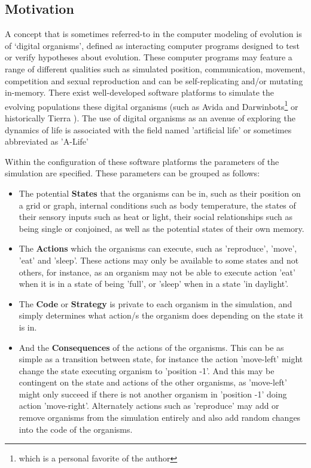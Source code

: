 \subsection{Motivation}
A concept that is sometimes referred-to in the computer modeling of evolution is of `digital organisms', defined as interacting computer programs designed to test or verify hypotheses about evolution.\cite{Lenski1999, Lenski2003, 10.1371/journal.pbio.0000018} These computer programs may feature a range of different qualities such as simulated position, communication, movement, competition and sexual reproduction and can be self-replicating and/or mutating in-memory. There exist well-developed software platforms to simulate the evolving populations these digital organisms (such as Avida and Darwinbots\footnote{which is a personal favorite of the author} or historically Tierra \cite{ray-approach-to-synthesis-1991}). The use of digital organisms as an avenue of exploring the dynamics of life is associated with the field named 'artificial life' or sometimes abbreviated as 'A-Life' \cite{journals/alife/BedauMPRAGIKR00}\cite{alife1}

Within the configuration of these software platforms the parameters of the simulation are specified. These parameters can be grouped as follows:

\begin{itemize}[leftmargin=*,labelsep=4mm]
\item   The potential \textbf{States} that the organisms can be in, such as their position on a grid or graph, internal conditions such as body temperature, the states of their sensory inputs such as heat or light, their social relationships such as being single or conjoined, as well as the potential states of their own memory.
\item   The \textbf{Actions} which the organisms can execute, such as 'reproduce', 'move', 'eat' and 'sleep'. These actions may only be available to some states and not others, for instance, as an organism may not be able to execute action 'eat' when it is in a state of being 'full', or 'sleep' when in a state 'in daylight'.
\item   The \textbf{Code} or \textbf{Strategy} is private to each organism in the simulation, and simply determines what action/s the organism does depending on the state it is in.
\item   And the \textbf{Consequences} of the actions of the organisms. This can be as simple as a transition between state, for instance the action 'move-left' might change the state executing organism to 'position -1'. And this may be contingent on the state and actions of the other organisms, as 'move-left' might only succeed if there is not another organism in 'position -1' doing action 'move-right'. Alternately actions such as 'reproduce' may add or remove organisms from the simulation entirely and also add random changes into the code of the organisms.
\end{itemize}


